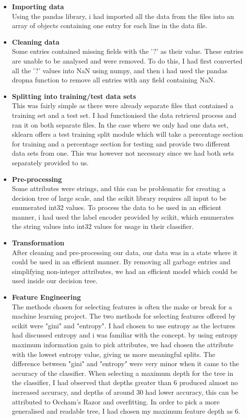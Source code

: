 \documentclass{article}
\begin{document}
\begin{itemize}
    \item \textbf{Importing data}\\
    Using the pandas library, i had imported all the data from the files into an array of objects containing one entry for each line in the data file.
    \item \textbf{Cleaning data}\\
    Some entries contained missing fields with the '?' as their value. These entries are unable to be analysed and were removed. To do this, I had first converted all the '?' values into NaN using numpy, and then i had used the pandas dropna function to remove all entries with any field containing NaN.
    \item \textbf{Splitting into training/test data sets}\\
    This was fairly simple as there were already separate files that contained a training set and a test set. I had functionised the data retrieval process and ran it on both separate files. In the case where we only had one data set, sklearn offers a test training split module which will take a percentage section for training and a percentage section for testing and provide two different data sets from one. This was however not necessary since we had both sets separately provided to us.
    \item \textbf{Pre-processing}\\
    Some attributes were strings, and this can be problematic for creating a decision tree of large scale, and the scikit library requires all input to be enumerated int32 values. To process the data to be used in an efficient manner, i had used the label encoder provided by scikit, which enumerates the string values into int32 values for usage in their classifier.
    \item \textbf{Transformation}\\
    After cleaning and pre-processing our data, our data was in a state where it could be used in an efficient manner. By removing all garbage entries and simplifying non-integer attributes, we had an efficient model which could be used inside our decision tree.
    \item \textbf{Feature Engineering}\\
    The methods chosen for selecting features is often the make or break for a machine learning project. The two methods for selecting features offered by scikit were "gini" and "entropy". I had chosen to use entropy as the lectures had discussed entropy and i was familiar with the concept. by using entropy maximum information gain to pick attributes, we had chosen the attribute with the lowest entropy value, giving us more meaningful splits. The difference between "gini" and "entropy" were very minor when it came to the accuracy of the classifier. When selecting a maximum depth for the tree in the classifier, I had observed that depths greater than 6 produced almost no increased accuracy, and depths of around 30 had lower accuracy, this can be attributed to Occham's Razor and overfitting. In order to pick a more generalised and readable tree, I had chosen my maximum feature depth as 6.
\end{itemize}
\end{document}
